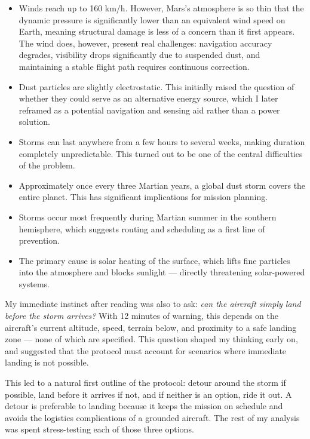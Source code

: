 \documentclass[a4paper,12pt]{article}
\begin{document}
\begin{itemize}[itemsep=0.3em]
    \item Winds reach up to 160 km/h. However, Mars's atmosphere is so thin that the dynamic
    pressure is significantly lower than an equivalent wind speed on Earth, meaning structural
    damage is less of a concern than it first appears. The wind does, however, present real
    challenges: navigation accuracy degrades, visibility drops significantly due to suspended
    dust, and maintaining a stable flight path requires continuous correction.

    \item Dust particles are slightly electrostatic. This initially raised the question of whether
    they could serve as an alternative energy source, which I later reframed as a potential
    navigation and sensing aid rather than a power solution.

    \item Storms can last anywhere from a few hours to several weeks, making duration
    completely unpredictable. This turned out to be one of the central difficulties of the problem.

    \item Approximately once every three Martian years, a global dust storm covers the entire
    planet. This has significant implications for mission planning.

    \item Storms occur most frequently during Martian summer in the southern hemisphere,
    which suggests routing and scheduling as a first line of prevention.

    \item The primary cause is solar heating of the surface, which lifts fine particles into
    the atmosphere and blocks sunlight — directly threatening solar-powered systems.
\end{itemize}

My immediate instinct after reading was also to ask: \textit{can the aircraft simply land before
the storm arrives?} With 12 minutes of warning, this depends on the aircraft's current altitude,
speed, terrain below, and proximity to a safe landing zone — none of which are specified. This
question shaped my thinking early on, and suggested that the protocol must account for scenarios
where immediate landing is not possible.

This led to a natural first outline of the protocol: detour around the storm if possible,
land before it arrives if not, and if neither is an option, ride it out. A detour is preferable
to landing because it keeps the mission on schedule and avoids the logistics complications of
a grounded aircraft. The rest of my analysis was spent stress-testing each of those three options.
\end{document}
